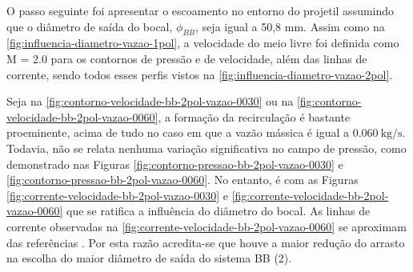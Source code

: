 O passo seguinte foi apresentar o escoamento no entorno do projetil assumindo que o diâmetro de saída do bocal, $\phi_{BB}$, seja igual a 50,8 mm. Assim como na \autoref{fig:influencia-diametro-vazao-1pol}, a velocidade do meio livre foi definida como M = \num{2,0} para os contornos de pressão e de velocidade, além das linhas de corrente, sendo todos esses perfis vistos na \autoref{fig:influencia-diametro-vazao-2pol}.

Seja na \autoref{fig:contorno-velocidade-bb-2pol-vazao-0030} ou na \autoref{fig:contorno-velocidade-bb-2pol-vazao-0060}, a formação da recirculação é bastante proeminente, acima de tudo no caso em que a vazão mássica é igual a $\qty{0,060}{\kilogram\per\second}$. Todavia, não se relata nenhuma variação significativa no campo de pressão, como demonstrado nas Figuras \ref{fig:contorno-pressao-bb-2pol-vazao-0030} e \ref{fig:contorno-pressao-bb-2pol-vazao-0060}. No entanto, é com as Figuras \ref{fig:corrente-velocidade-bb-2pol-vazao-0030} e \ref{fig:corrente-velocidade-bb-2pol-vazao-0060} que se ratifica a influência do diâmetro do bocal. As linhas de corrente observadas na \autoref{fig:corrente-velocidade-bb-2pol-vazao-0060} se aproximam das referências \cite{Sahu1985,Mahmoud2009,Lucena2020}. Por esta razão acredita-se que houve a maior redução do arrasto na escolha do maior diâmetro de saída do sistema BB (\qty{2}{\polegada}).


